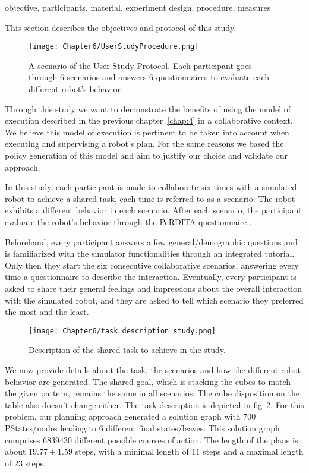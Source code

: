 objective, participants, material, experiment design, procedure, measures

This section describes the objectives and protocol of this study.  



\begin{figure}
    \centering
    \texttt{[image: Chapter6/UserStudyProcedure.png]}
    \caption{A scenario of the User Study Protocol. Each participant goes through 6 scenarios and answers 6 questionnaires to evaluate each different robot's behavior}
    \label{fig:user_study_protocol}
\end{figure}




Through this study we want to demonstrate the benefits of using the model of execution described in the previous chapter~\ref{chap:4} in a collaborative context. We believe this model of execution is pertinent to be taken into account when executing and supervising a robot's plan. For the same reasons we based the policy generation of this model and aim to justify our choice and validate our approach.

In this study, each participant is made to collaborate six times with a simulated robot to achieve a shared task, each time is referred to as a scenario. The robot exhibits a different behavior in each scenario. After each scenario, the participant evaluate the robot's behavior through the PeRDITA questionnaire \cite{devin_evaluating_2018}.

Beforehand, every participant answers a few general/demographic questions and is familiarized with the simulator functionalities through an integrated tutorial. Only then they start the six consecutive collaborative scenarios, answering every time a questionnaire to describe the interaction. Eventually, every participant is asked to share their general feelings and impressions about the overall interaction with the simulated robot, and they are asked to tell which scenario they preferred the most and the least.

\begin{figure}
    \centering
    \texttt{[image: Chapter6/task\_description\_study.png]}
    \caption{Description of the shared task to achieve in the study.}
    \label{fig:task_description_study}
\end{figure}

We now provide details about the task, the scenarios and how the different robot behavior are generated. 
The shared goal, which is stacking the cubes to match the given pattern, remains the same in all scenarios. The cube disposition on the table also doesn't change either. The task description is depicted in fig~\ref{fig:task_description_study}. For this problem, our planning approach generated a solution graph with 700 PStates/nodes leading to 6 different final states/leaves. This solution graph comprises $6839430$ different possible courses of action. The length of the plans is about $19.77 \pm 1.59$ steps, with a minimal length of $11$ steps and a maximal length of $23$ steps.

